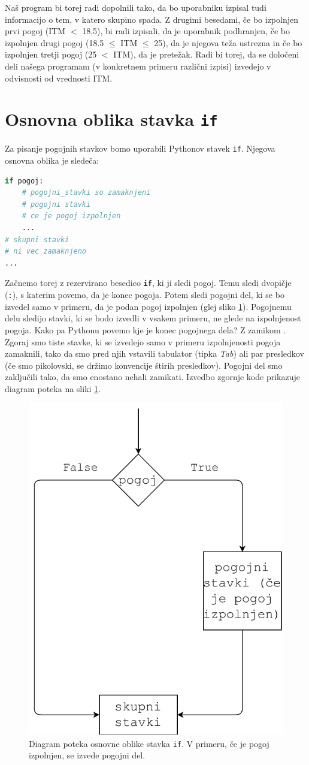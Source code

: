Naš program bi torej radi dopolnili tako, da bo uporabniku izpisal tudi informacijo o tem, v katero skupino spada. Z drugimi besedami, če bo izpolnjen prvi pogoj (ITM $<$ 18.5), bi radi izpisali, da je uporabnik podhranjen, če bo izpolnjen drugi pogoj (18.5 $\leq$ ITM $\leq$ 25), da je njegova teža ustrezna in če bo izpolnjen tretji pogoj (25 $<$ ITM), da je pretežak. Radi bi torej, da se določeni deli našega programam (v konkretnem primeru različni izpisi) izvedejo v odvisnosti od vrednosti ITM. 

\section{Osnovna oblika stavka \texttt{if}}

Za pisanje pogojnih stavkov bomo uporabili Pythonov stavek \texttt{if}. Njegova osnovna oblika je sledeča:
\begin{lstlisting}[language=Python]
if pogoj:
    # pogojni_stavki so zamaknjeni
    # pogojni stavki
    # ce je pogoj izpolnjen
    ...
# skupni stavki
# ni vec zamaknjeno
...
\end{lstlisting}
Začnemo torej z rezervirano besedico \textbf{\texttt{if}}, ki ji sledi pogoj. Temu sledi dvopičje (\texttt{:}), s katerim povemo, da je konec pogoja. Potem sledi pogojni del, ki se bo izvedel samo v primeru, da je podan pogoj izpolnjen (glej sliko \ref{img:if1}). Pogojnemu delu sledijo stavki, ki se bodo izvedli v vsakem primeru, ne glede na izpolnjenost pogoja. Kako pa Pythonu povemo kje je konec pogojnega dela? Z zamikom . Zgoraj smo tiste stavke, ki se izvedejo samo v primeru izpolnjenosti pogoja zamaknili, tako da smo pred njih vstavili tabulator (tipka \emph{Tab}) ali par presledkov (če smo pikolovski, se držimo konvencije štirih presledkov). Pogojni del smo zaključili tako, da smo enostano nehali zamikati. Izvedbo zgornje kode prikazuje diagram poteka na sliki \ref{img:if1}.
\begin{figure}
    \centering
    \includegraphics[width=0.5\linewidth]{img/if1.pdf}
    \caption{Diagram poteka osnovne oblike stavka \texttt{if}. V primeru, če je pogoj izpolnjen, se izvede pogojni del.}
    \label{img:if1}
\end{figure}

